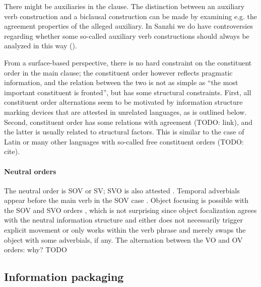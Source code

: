 \documentclass[a4paper, oneside, 12pt]{report}
\newcommand*{\citetable}[1]{Table~{#1}}
\newcommand*{\citepage}[1]{p.~{#1}}
\newcommand*{\citepages}[1]{pp.~{#1}}
\begin{document}
There might be auxiliaries in the clause.
The distinction between an auxiliary verb construction 
and a biclausal construction 
can be made by examining e.g. the agreement properties of the alleged auxiliary.
In Sanzhi we do have controversies regarding whether some so-called auxiliary verb constructions 
should always be analyzed in this way
(). 

From a surface-based perspective, 
there is no hard constraint on the constituent order in the main clause;
the constituent order however reflects pragmatic information,
and the relation between the two is not as simple as 
``the most important constituent is fronted'',
but has some structural constraints.
First, all constituent order alternations seem to be motivated by 
information structure marking devices that are attested in unrelated languages, 
as is outlined below.
Second, constituent order has some relations with agreement (TODO: link), 
and the latter is usually related to structural factors. 
This is similar to the case of Latin or many other 
languages with so-called free constituent orders (TODO: cite).

\paragraph*{Neutral orders}
The neutral order is SOV or SV; SVO is also attested
\citep[\citetable{27.1}]{forker2020grammar}.
Temporal adverbials appear before the main verb in the SOV case 
\citep[\citepage{520}, (30)]{forker2020grammar}.
Object focusing is possible with the SOV and SVO orders
\citep[\citepages{520-521}]{forker2020grammar}, 
which is not surprising since object focalization agrees with the neutral information structure 
and either does not necessarily trigger explicit movement
or only works within the verb phrase and merely swaps the object with some adverbials, if any.
The alternation between the VO and OV orders: why? TODO



\subsection{Information packaging}
\end{document}
